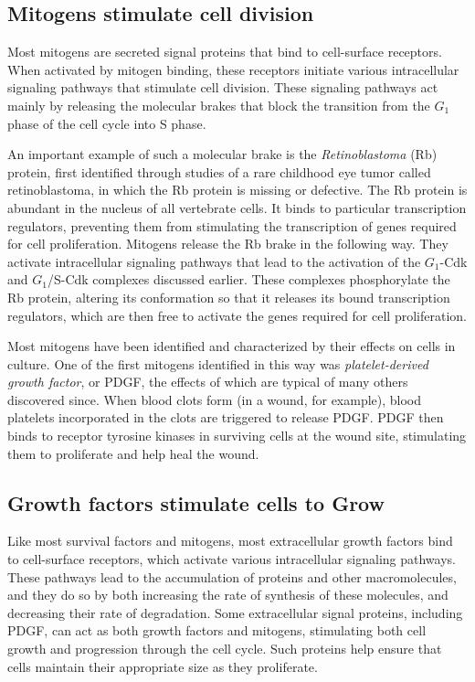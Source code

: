 \subsection{Mitogens stimulate cell division}

Most mitogens are secreted signal proteins that bind to cell-surface
receptors. When activated by mitogen binding, these receptors initiate
various intracellular signaling pathways that
stimulate cell division. These signaling pathways act mainly by releasing
the molecular brakes that block the transition from the $G_1$ phase of the
cell cycle into S phase.

An important example of such a molecular brake is the \textit{Retinoblastoma}
(Rb) protein, first identified through studies of a rare childhood eye tumor
called retinoblastoma, in which the Rb protein is missing or defective. The
Rb protein is abundant in the nucleus of all vertebrate cells. It binds to
particular transcription regulators, preventing them from stimulating the
transcription of genes required for cell proliferation. Mitogens release the
Rb brake in the following way. They activate intracellular signaling pathways
that lead to the activation of the $G_1$-Cdk and $G_1$/S-Cdk complexes
discussed earlier. These complexes phosphorylate the Rb protein, altering
its conformation so that it releases its bound transcription regulators,
which are then free to activate the genes required for cell proliferation.

Most mitogens have been identified and characterized by their effects
on cells in culture. One of the first mitogens identified in
this way was \textit{platelet-derived growth factor}, or PDGF, the effects of which
are typical of many others discovered since. When blood clots form (in
a wound, for example), blood platelets incorporated in the clots are triggered
to release PDGF. PDGF then binds to receptor tyrosine kinases
in surviving cells at the wound site, stimulating
them to proliferate and help heal the wound.

\subsection{Growth factors stimulate cells to Grow}

Like most survival factors and mitogens, most extracellular growth factors
bind to cell-surface receptors, which activate various intracellular
signaling pathways. These pathways lead to the accumulation of proteins
and other macromolecules, and they do so by both increasing the rate of
synthesis of these molecules, and decreasing their rate of degradation.
Some extracellular signal proteins, including PDGF, can
act as both growth factors and mitogens, stimulating both cell growth
and progression through the cell cycle. Such proteins help ensure that
cells maintain their appropriate size as they proliferate.

